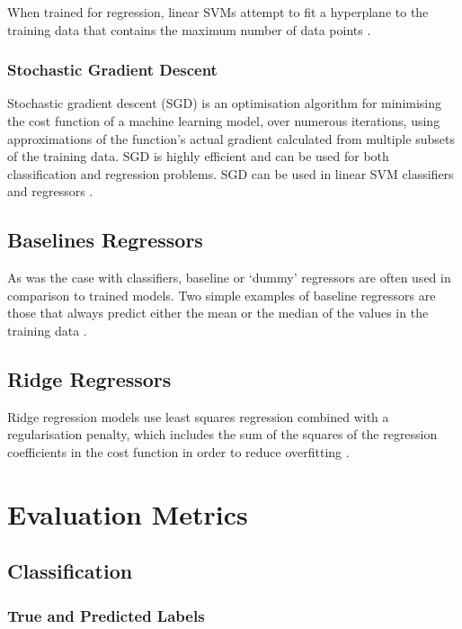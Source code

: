 When trained for regression, linear SVMs attempt to fit a hyperplane to the training data that contains the maximum number of data points \cite{smola2004tutorial}.

\subsubsection{Stochastic Gradient Descent}

Stochastic gradient descent (SGD) is an optimisation algorithm for minimising the cost function of a machine learning model, over numerous iterations, using approximations of the function's actual gradient calculated from multiple subsets of the training data. SGD is highly efficient and can be used for both classification and regression problems. SGD can be used in linear SVM classifiers and regressors \cite{pedregosa2011scikit}.

\subsection{Baselines Regressors} \label{sec:TBG_BLR}

As was the case with classifiers, baseline or `dummy' regressors are often used in comparison to trained models. Two simple examples of baseline regressors are those that always predict either the mean or the median of the values in the training data \cite{pedregosa2011scikit}.

\subsection{Ridge Regressors} \label{sec:TBG_ML_Ridge}

Ridge regression models use least squares regression combined with a regularisation penalty, which includes the sum of the squares of the regression coefficients in the cost function in order to reduce overfitting \cite{dangeti2017statistics}.

\section{Evaluation Metrics} \label{sec:TBG_Eval}

\subsection{Classification} \label{sec:TBG_Eval_Class}

\subsubsection{True and Predicted Labels}

